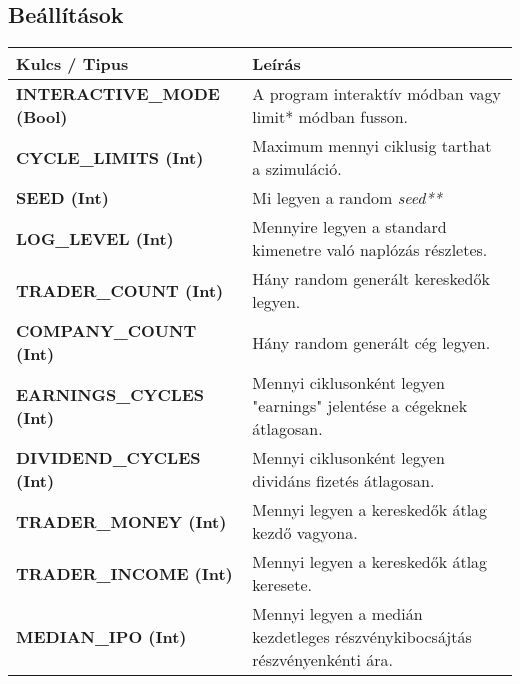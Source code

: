 \documentclass[./terv.tex]{subfiles}
\begin{document}
    \subsection{Beállítások}
    \begin{center}
        \begin{tabular}{ | p{5.5cm} || p{5.5cm} | }
            \hline
            \textbf{Kulcs / Tipus}               & Leírás                                                                                \\
            \hline
            \textbf{INTERACTIVE\_MODE (Bool)}    & A program interaktív módban vagy limit* módban fusson.                                \\
            \hline
            \textbf{CYCLE\_LIMITS (Int)}         & Maximum mennyi ciklusig tarthat a szimuláció.                                         \\
            \hline
            \textbf{SEED (Int)}                  & Mi legyen a random \textit{seed**}                                                    \\
            \hline
            \textbf{LOG\_LEVEL (Int)}            & Mennyire legyen a standard kimenetre való naplózás részletes.                         \\
            \hline
            \textbf{TRADER\_COUNT (Int)}         & Hány random generált kereskedők legyen.                                               \\
            \hline
            \textbf{COMPANY\_COUNT (Int)}        & Hány random generált cég legyen.                                                      \\
            \hline
            \textbf{EARNINGS\_CYCLES (Int)}      & Mennyi ciklusonként legyen "earnings" jelentése a cégeknek átlagosan.                 \\
            \hline
            \textbf{DIVIDEND\_CYCLES (Int)}      & Mennyi ciklusonként legyen dividáns fizetés átlagosan.                                \\
            \hline
            \textbf{TRADER\_MONEY (Int)}         & Mennyi legyen a kereskedők átlag kezdő vagyona.                                       \\
            \hline
            \textbf{TRADER\_INCOME (Int)}        & Mennyi legyen a kereskedők átlag keresete.                                            \\
            \hline
            \textbf{MEDIAN\_IPO (Int)}           & Mennyi legyen a medián kezdetleges részvénykibocsájtás részvényenkénti ára.           \\

\end{tabular}
\end{center}
\end{document}

